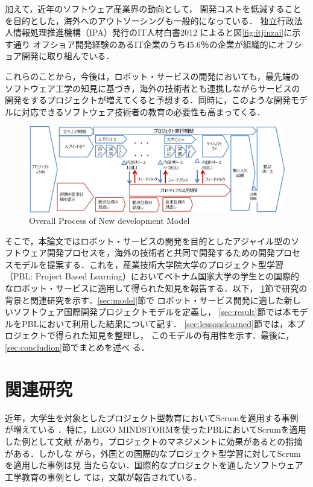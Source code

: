 \documentclass[a4j, 12Q, twocolumn, twoside]{jsarticle}
\begin{document}
加えて，近年のソフトウェア産業界の動向として，
開発コストを低減することを目的とした，海外へのアウトソーシングも一般的になっている．
独立行政法人情報処理推進機構（IPA）発行のIT人材白書2012
\cite{IT人材白書2012}
によると図\ref{fig:itjinzai}に示す通り
オフショア開発経験のあるIT企業のうち45.6％の企業が組織的にオフショア開発に取り組んでいる．

これらのことから，今後は，ロボット・サービスの開発においても，最先端の
ソフトウェア工学の知見に基づき，海外の技術者とも連携しながらサービスの
開発をするプロジェクトが増えてくると予想する．同時に，このような開発モデ
ルに対応できるソフトウェア技術者の教育の必要性も高まってくる．

\begin{figure}
  \begin{center}
    \includegraphics[width=\textwidth,trim=0mm -5mm 0mm 0mm, clip]{./figures/Process.png}
    \caption{Overall Process of New development Model}
    \label{fig:OverallProcessofNewdevelopmentMode}
  \end{center}
\end{figure}

そこで，本論文ではロボット・サービスの開発を目的としたアジャイル型のソ
フトウェア開発プロセスを，海外の技術者と共同で開発するための開発プロセ
スモデルを提案する．これを，産業技術大学院大学のプロジェクト型学習
（PBL: Project Based Learning）においてベトナム国家大学の学生との国際的
なロボット・サービスに適用して得られた知見を報告する．以下，
\ref{sec:background}節で研究の背景と関連研究を示す．\ref{sec:model}節で
ロボット・サービス開発に適した新しいソフトウェア国際開発プロジェクトモデルを定義し，
\ref{sec:result}節では本モデルをPBLにおいて利用した結果について記す．
\ref{sec:lessonslearned}節では，本プロジェクトで得られた知見を整理し，
このモデルの有用性を示す．最後に，\ref{sec:concludion}節でまとめを述べ
る．

\section{関連研究}\label{sec:background}
近年，大学生を対象としたプロジェクト型教育においてScrumを適用する事例
が増えている
\cite{mahnic2012capstone,mahnic2012students,wagh2012using,devedzic2011teaching}
．特に，LEGO MINDSTORMを使ったPBLにおいてScrumを適用した例として文献
\cite{pinto2009useofscrum}
があり，プロジェクトのマネジメントに効果があるとの指摘がある．しかしな
がら，外国との国際的なプロジェクト型学習に対してScrumを適用した事例は見
当たらない．国際的なプロジェクトを通したソフトウェア工学教育の事例とし
ては，文献\cite{de2006germany}が報告されている．
\end{document}
